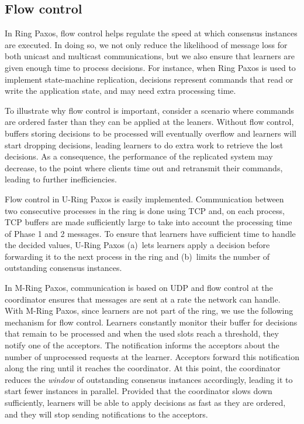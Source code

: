 \documentclass[final,3p,times,twocolumn,authoryear]{elsarticle}
\begin{document}
\subsection{Flow control}
\label{sec:flowcontrol}

In Ring Paxos, flow control helps regulate the speed at which consensus instances are executed. In doing so, we not only reduce the likelihood of message loss for both unicast and multicast communications, but we also ensure that learners are given enough time to process decisions. For instance, when Ring Paxos is used to implement state-machine replication, decisions represent commands that read or write the application state, and may need extra processing time.

To illustrate why flow control is important, consider a scenario where commands are ordered faster than they can be applied at the leaners. Without flow control, buffers storing decisions to be processed will eventually overflow and learners will start dropping decisions, leading learners to do extra work to retrieve the lost decisions.  As a consequence, the performance of the replicated system may decrease, to the point where clients time out and retransmit their commands, leading to further inefficiencies.

Flow control in U-Ring Paxos is easily implemented. Communication between two consecutive processes in the ring is done using TCP and, on each process, TCP buffers are made sufficiently large to take into account the processing time of Phase 1 and 2 messages. To ensure that learners have sufficient time to handle the decided values, U-Ring Paxos (a)~lets learners apply a decision before forwarding it to the next process in the ring and (b)~limits the number of outstanding consensus instances.

In M-Ring Paxos, communication is based on UDP and flow control at the coordinator ensures that messages are sent at a rate the network can handle. With M-Ring Paxos, since learners are not part of the ring, we use the following mechanism for flow control. Learners constantly monitor their buffer for decisions that remain to be processed and when the used slots reach a threshold, they  notify one of the acceptors. The notification informs the acceptors about the number of unprocessed requests at the learner. Acceptors forward this notification along the ring until it reaches the coordinator. At this point, the coordinator reduces the \emph{window} of outstanding consensus instances accordingly, leading it to start fewer instances in parallel. Provided that the coordinator slows down sufficiently, learners will be able to apply decisions as fast as they are ordered,  and they will stop sending notifications to the acceptors. 
\end{document}
